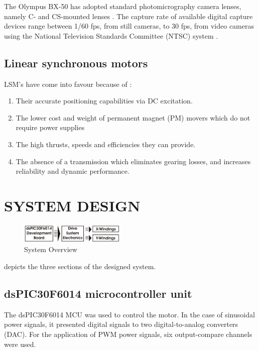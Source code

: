 \documentclass[10pt,twocolumn]{witseiepaper}
\begin{document}
The Olympus BX-50 has adopted standard photomicrography camera lenses, namely
C- and CS-mounted lenses \cite{Olympus}.  The capture rate of available
digital capture devices range between 1/60 fps, from still cameras, to 30 fps,
from video cameras using the National Television Standards Committee (NTSC)
system \cite{Olympus}.

\subsection{Linear synchronous motors}

LSM's have come into favour because of \cite{Halbach-1,XY-Thrust}:
\begin{enumerate}
	\item Their accurate positioning capabilities via DC excitation.
	\item The lower cost and weight of permanent magnet (PM) movers which do not require power supplies
	\item The high thrusts, speeds and efficiencies they can provide.
	\item The absence of a transmission which eliminates gearing losses, and increases reliability and dynamic performance.
\end{enumerate}

\section{SYSTEM DESIGN}

\begin{figure}[ht]
	\centering
		\includegraphics[width=0.45\textwidth]{../../Drawings/Flow-Diagram.pdf}
	\caption{System Overview}
	\label{fig:Sys}
\end{figure}
 depicts the three sections of the designed system.

\subsection{dsPIC30F6014 microcontroller unit}
The dsPIC30F6014 MCU \cite{Microchip} was used to control the motor.  In the
case of sinusoidal power signals, it presented digital signals to two
digital-to-analog converters (DAC).  For the application of PWM power signals,
six output-compare channels were used.
 
\end{document}
